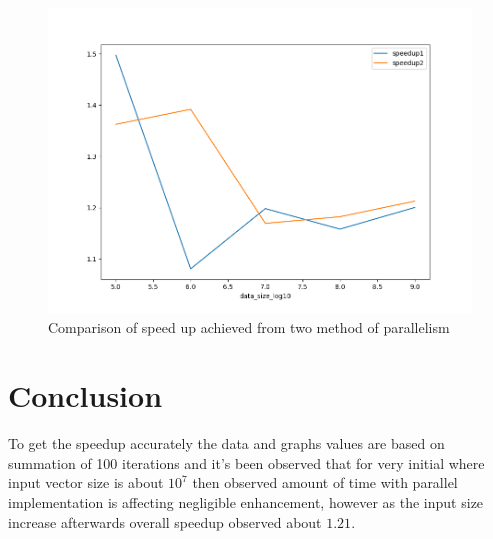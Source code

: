 \documentclass[paper=letter, fontsize=12pt]{article}
\begin{document}
\begin{figure}[H]
    \centering
    \includegraphics[width=\linewidth]{assets/speedup_graph.png}
    \caption{Comparison of speed up achieved from two method of parallelism}
\end{figure}

\section{Conclusion}
To get the speedup accurately the data and graphs values are based on summation of 100 iterations and it's been observed that for very initial where input vector size is about $ 10^7 $ then observed amount of time with parallel implementation is affecting negligible enhancement, however as the input size increase afterwards overall speedup observed about $ 1.21 $.
\end{document}
